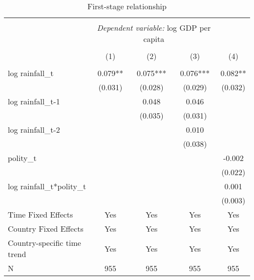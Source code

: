 \documentclass{article}
\begin{document}

\begin{table}
\caption{First-stage relationship}
\begin{center}
\begin{tabular}{lcccc}
\hline \\[-1.8ex] 
 & \multicolumn{3}{c}{\textit{Dependent variable:} log GDP per capita} \\ 
\hline \\[-1.8ex]
                      &      (1)    &      (2)    &     (3)     &      (4)      \\
\hline \\[-1.8ex]
\midrule
log rainfall_{t}          & 0.079**     & 0.075***    & 0.076***    & 0.082**      \\
                      & (0.031)     & (0.028)     & (0.029)     & (0.032)      \\
log rainfall_{t-1}        &             & 0.048       & 0.046       &              \\
                      &             & (0.035)     & (0.031)     &              \\
log rainfall_{t-2}        &             &             & 0.010       &              \\
                      &             &             & (0.038)     &              \\
polity_{t}            &             &             &             & -0.002       \\
                      &             &             &             & (0.022)      \\
log rainfall_{t}*polity_{t}  &             &             &             & 0.001        \\
                      &             &             &             & (0.003)      \\

Time Fixed Effects    & Yes         & Yes         & Yes         & Yes          \\
Country Fixed Effects & Yes         & Yes         & Yes         & Yes          \\
Country-specific 
time trend            & Yes         & Yes         & Yes         & Yes          \\
N                     & 955         & 955         & 955         & 955          \\
\hline
\end{tabular}
\end{center}
\end{table}
\end{document}
